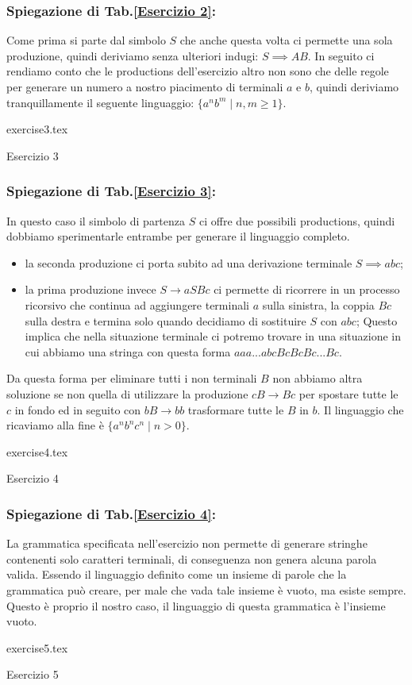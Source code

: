 \documentclass[class=book, crop=false, oneside, 12pt]{standalone}
\begin{document}
\subsubsection*{Spiegazione di Tab.\ref{Esercizio 2}:}
Come prima si parte dal simbolo \(S\) che anche questa volta ci permette una sola produzione, quindi deriviamo senza ulteriori indugi: \(S \implies AB\). In seguito ci rendiamo conto che le productions dell'esercizio altro non sono che delle regole per generare un numero a nostro piacimento di terminali \(a\) e \(b\), quindi deriviamo tranquillamente il seguente linguaggio: \(\{a^n b^m \mid n,m \ge 1\}\).
\begin{table}[H]
	\centering
	{exercise3.tex}
    \caption{Esercizio 3}
    \label{Esercizio 3}
\end{table}
\subsubsection*{Spiegazione di Tab.\ref{Esercizio 3}:}
In questo caso il simbolo di partenza \(S\) ci offre due possibili productions, quindi dobbiamo sperimentarle entrambe per generare il linguaggio completo.
\begin{itemize}
    \item la seconda produzione ci porta subito ad una derivazione terminale \(S \implies abc\);
    \item la prima produzione invece \(S \to aSBc\) ci permette di ricorrere in un processo ricorsivo che continua ad aggiungere terminali \(a\) sulla sinistra, la coppia \(Bc\) sulla destra e termina solo quando decidiamo di sostituire \(S\) con \(abc\); Questo implica che nella situazione terminale ci potremo trovare in una situazione in cui abbiamo una stringa con questa forma \(aaa...abcBcBcBc...Bc\).
\end{itemize}
Da questa forma per eliminare tutti i non terminali \(B\) non abbiamo altra soluzione se non quella di utilizzare la produzione \(cB \to Bc\) per spostare tutte le \(c\) in fondo ed in seguito con \(bB \to bb\) trasformare tutte le \(B\) in \(b\). Il linguaggio che ricaviamo alla fine è \(\{a^nb^nc^n \mid n>0\}\).
\begin{table}[H]
	\centering
	{exercise4.tex}
    \caption{Esercizio 4}
    \label{Esercizio 4}
\end{table}
\subsubsection*{Spiegazione di Tab.\ref{Esercizio 4}:}
La grammatica specificata nell'esercizio non permette di generare stringhe contenenti solo caratteri terminali, di conseguenza non genera alcuna parola valida. Essendo il linguaggio definito come un insieme di parole che la grammatica può creare, per male che vada tale insieme è vuoto, ma esiste sempre. Questo è proprio il nostro caso, il linguaggio di questa grammatica è l’insieme vuoto.
\begin{table}[H]
	\centering
	{exercise5.tex}
    \caption{Esercizio 5}
    \label{Esercizio 5}
\end{table}
\end{document}
